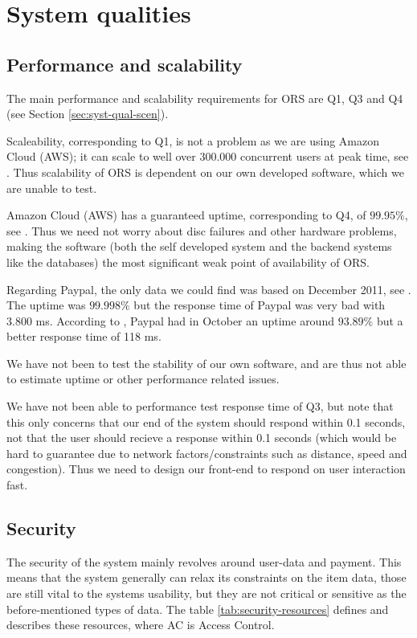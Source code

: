 \chapter{System qualities}
\label{cha:system-qualities}
\thispagestyle{fancy}


\section{Performance and scalability}
\label{sec:perf-scal}
The main performance and scalability requirements for ORS are Q1, Q3 and Q4
(see Section \ref{sec:syst-qual-scen}).

Scaleability, corresponding to Q1, is not a problem as we are using Amazon
Cloud (AWS); it can scale to well over 300.000 concurrent users at peak time,
see \cite{amazonCaseStudy}. Thus scalability of ORS is dependent on our own
developed software, which we are unable to test.

Amazon Cloud (AWS) has a guaranteed uptime, corresponding to Q4, of $99.95\%$,
see \cite{amazonSla}. Thus we need not worry about disc failures and other
hardware problems, making the software (both the self developed system and the
backend systems like the databases) the most significant weak point of
availability of ORS.

Regarding Paypal, the only data we could find was based on December 2011, see
\cite{pingdom}. The uptime was $99.998\%$ but the response time of Paypal was
very bad with 3.800 ms. According to \cite{basicState}, Paypal had in October
an uptime around $93.89\%$ but a better response time of 118 ms.

We have not been to test the stability of our own software, and are thus not
able to estimate uptime or other performance related issues.

We have not been able to performance test response time of Q3, but note that
this only concerns that our end of the system should respond within 0.1
seconds, not that the user should recieve a response within 0.1 seconds (which
would be hard to guarantee due to network factors/constraints such as distance,
speed and congestion). Thus we need to design our front-end to respond on user
interaction fast.


\section{Security}
\label{sec:security}
The security of the system mainly revolves around user-data and payment. This
means that the system generally can relax its constraints on the item data,
those are still vital to the systems usability, but they are not critical or
sensitive as the before-mentioned types of data. The table
\ref{tab:security-resources} defines and describes these resources, where AC is
Access Control.

